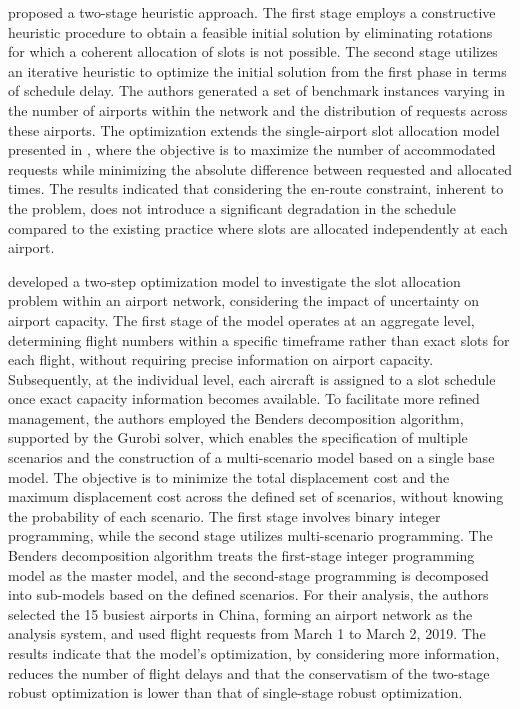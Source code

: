  proposed a two-stage heuristic approach.
%
The first stage employs a constructive heuristic procedure to obtain a feasible
initial solution by eliminating rotations for which a coherent allocation of
slots is not possible.
%
The second stage utilizes an iterative heuristic to optimize the initial
solution from the first phase in terms of schedule delay.
%
The authors generated a set of benchmark instances varying in the number of
airports within the network and the distribution of requests across these
airports.
%
The optimization extends the single-airport slot allocation model presented in
\cite{zografos2012dealing}, where the objective is to maximize the number of
accommodated requests while minimizing the absolute difference between requested
and allocated times.
%
The results indicated that considering the en-route constraint, inherent to the
problem, does not introduce a significant degradation in the schedule compared
to the existing practice where slots are allocated independently at each
airport.



  developed a two-step optimization model to
investigate the slot allocation problem within an airport network, considering
the impact of uncertainty on airport capacity.
%
The first stage of the model operates at an aggregate level, determining flight
numbers within a specific timeframe rather than exact slots for each flight,
without requiring precise information on airport capacity.
%
Subsequently, at the individual level, each aircraft is assigned to a slot
schedule once exact capacity information becomes available.
%
To facilitate more refined management, the authors employed the Benders
decomposition algorithm, supported by the Gurobi solver, which enables the
specification of multiple scenarios and the construction of a multi-scenario
model based on a single base model.
%
The objective is to minimize the total displacement cost and the maximum
displacement cost across the defined set of scenarios, without knowing the
probability of each scenario.
%
The first stage involves binary integer programming, while the second stage
utilizes multi-scenario programming.
%
The Benders decomposition algorithm treats the first-stage integer programming
model as the master model, and the second-stage programming is decomposed into
sub-models based on the defined scenarios.
%
For their analysis, the authors selected the 15 busiest airports in China,
forming an airport network as the analysis system, and used flight requests from
March 1 to March 2, 2019.
%
The results indicate that the model's optimization, by considering more
information, reduces the number of flight delays and that the conservatism of
the two-stage robust optimization is lower than that of single-stage robust
optimization.



